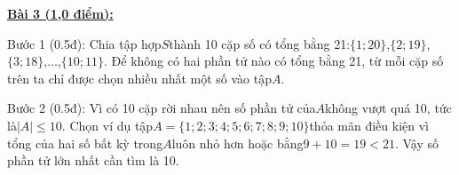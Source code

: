 \documentclass[11pt,a4paper]{article}
\begin{document}
\noindent\textbf{\underline{Bài 3 (1,0 điểm):}}\par\vspace{3pt}
Bước 1 (0.5đ): Chia tập hợp$S$thành 10 cặp số có tổng bằng 21:$\{1; 20\}$,$\{2; 19\}$,$\{3; 18\}$,$\dots$,$\{10; 11\}$. Để không có hai phần tử nào có tổng bằng 21, từ mỗi cặp số trên ta chỉ được chọn nhiều nhất một số vào tập$A$.\par\noindent Bước 2 (0.5đ): Vì có 10 cặp rời nhau nên số phần tử của$A$không vượt quá 10, tức là$|A| \le 10$. Chọn ví dụ tập$A = \{1; 2; 3; 4; 5; 6; 7; 8; 9; 10\}$thỏa mãn điều kiện vì tổng của hai số bất kỳ trong$A$luôn nhỏ hơn hoặc bằng$9 + 10 = 19 < 21$. Vậy số phần tử lớn nhất cần tìm là 10.\par\vspace{8pt}
\end{document}
